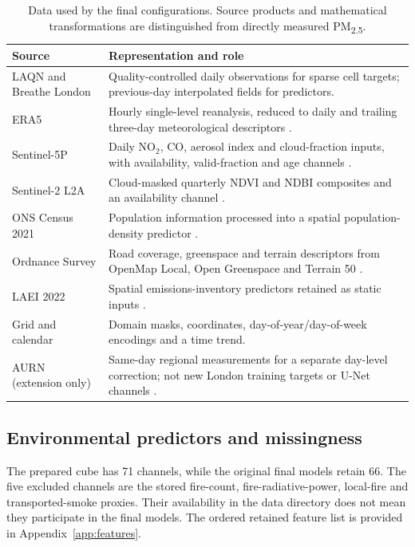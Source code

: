 \documentclass[11pt,a4paper]{article}
\newcommand{\pmfine}{PM\textsubscript{2.5}}
\begin{document}
\begin{table}[tb]
\caption{Data used by the final configurations. Source products and mathematical
transformations are distinguished from directly measured \pmfine.}
\label{tab:data}
\small
\begin{tabularx}{\linewidth}{@{}>{\raggedright\arraybackslash}p{.22\linewidth}X@{}}
\toprule
Source & Representation and role \\
\midrule
LAQN and Breathe London & Quality-controlled daily observations for sparse
cell targets; previous-day interpolated fields for predictors. \\
ERA5 & Hourly single-level reanalysis, reduced to daily and trailing three-day
meteorological descriptors \citep{hersbach2020}. \\
Sentinel-5P & Daily NO$_2$, CO, aerosol index and cloud-fraction inputs,
with availability, valid-fraction and age channels \citep{s5p}. \\
Sentinel-2 L2A & Cloud-masked quarterly NDVI and NDBI composites and an
availability channel \citep{s2}. \\
ONS Census 2021 & Population information processed into a spatial
population-density predictor \citep{ons2021}. \\
Ordnance Survey & Road coverage, greenspace and terrain descriptors from
OpenMap Local, Open Greenspace and Terrain 50 \citep{osdata}. \\
LAEI 2022 & Spatial emissions-inventory predictors retained as static
inputs \citep{laei2022}. \\
Grid and calendar & Domain masks, coordinates, day-of-year/day-of-week
encodings and a time trend. \\
AURN (extension only) & Same-day regional measurements for a separate
day-level correction; not new London training targets or U-Net channels
\citep{aurn}. \\
\bottomrule
\end{tabularx}
\end{table}

\subsection{Environmental predictors and missingness}
The prepared cube has 71 channels, while the original final models retain 66.
The five excluded channels are the stored fire-count, fire-radiative-power,
local-fire and transported-smoke proxies. Their availability in the data
directory does not mean they participate in the final models. The ordered
retained feature list is provided in Appendix~\ref{app:features}.
\end{document}
